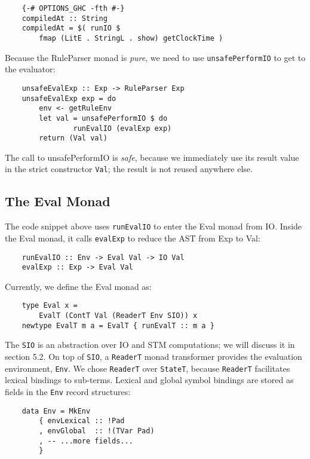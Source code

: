 \documentclass[]{sigplanconf}
\newcommand{\code}[1]{\texttt{#1}}
\begin{document}
\begin{lstlisting}
    {-# OPTIONS_GHC -fth #-}
    compiledAt :: String
    compiledAt = $( runIO $
        fmap (LitE . StringL . show) getClockTime )
\end{lstlisting}

Because the RuleParser monad is \emph{pure}, we need to use
\code{unsafePerformIO} to get to the evaluator:

\begin{lstlisting}
    unsafeEvalExp :: Exp -> RuleParser Exp
    unsafeEvalExp exp = do
        env <- getRuleEnv
        let val = unsafePerformIO $ do
                runEvalIO (evalExp exp)
        return (Val val)
\end{lstlisting}

The call to unsafePerformIO is \emph{safe}, because we immediately use its result
value in the strict constructor \code{Val}; the result is not reused anywhere else.

\subsection{The Eval Monad}
\label{sec:TheEvalMonad}

The code snippet above uses \code{runEvalIO} to enter the Eval monad from IO.
Inside the Eval monad, it calls \code{evalExp} to reduce the AST from Exp to Val:

\begin{lstlisting}
    runEvalIO :: Env -> Eval Val -> IO Val
    evalExp :: Exp -> Eval Val
\end{lstlisting}

Currently, we define the Eval monad as:

\begin{lstlisting}
    type Eval x =
        EvalT (ContT Val (ReaderT Env SIO)) x
    newtype EvalT m a = EvalT { runEvalT :: m a }
\end{lstlisting}

The \code{SIO} is an abstraction over IO and STM computations; we will discuss
it in section 5.2.  On top of \code{SIO}, a \code{ReaderT} monad transformer
provides the evaluation environment, \code{Env}.  We chose \code{ReaderT} over
\code{StateT}, because \code{ReaderT} facilitates lexical bindings to
sub-terms.  Lexical and global symbol bindings are stored as fields in the
\code{Env} record structures:

\begin{lstlisting}
    data Env = MkEnv
        { envLexical :: !Pad
        , envGlobal  :: !(TVar Pad)
        , -- ...more fields...
        }
\end{lstlisting}
\end{document}
